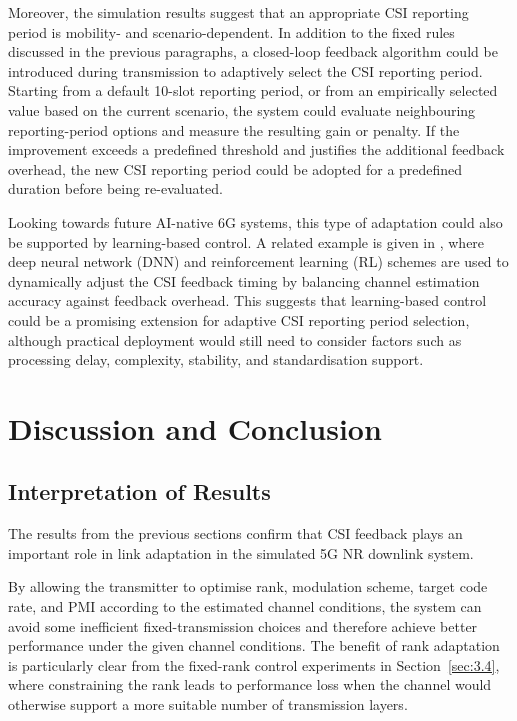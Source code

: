 \documentclass[a4paper,12pt,onecolumn]{article}
\begin{document}
		Moreover, the simulation results suggest that an appropriate CSI reporting period is mobility- and scenario-dependent. In addition to the fixed rules discussed in the previous paragraphs, a closed-loop feedback algorithm could be introduced during transmission to adaptively select the CSI reporting period. Starting from a default 10-slot reporting period, or from an empirically selected value based on the current scenario, the system could evaluate neighbouring reporting-period options and measure the resulting gain or penalty. If the improvement exceeds a predefined threshold and justifies the additional feedback overhead, the new CSI reporting period could be adopted for a predefined duration before being re-evaluated.

		Looking towards future AI-native 6G systems, this type of adaptation could also be supported by learning-based control. A related example is given in \cite{Hong2022AdaptiveCSI}, where deep neural network (DNN) and reinforcement learning (RL) schemes are used to dynamically adjust the CSI feedback timing by balancing channel estimation accuracy against feedback overhead. This suggests that learning-based control could be a promising extension for adaptive CSI reporting period selection, although practical deployment would still need to consider factors such as processing delay, complexity, stability, and standardisation support.
	
	

\section{Discussion and Conclusion}
	\subsection{Interpretation of Results}
		The results from the previous sections confirm that CSI feedback plays an important role in link adaptation in the simulated 5G NR downlink system. 
		
		By allowing the transmitter to optimise rank, modulation scheme, target code rate, and PMI according to the estimated channel conditions, the system can avoid some inefficient fixed-transmission choices and therefore achieve better performance under the given channel conditions. The benefit of rank adaptation is particularly clear from the fixed-rank control experiments in Section~\ref{sec:3.4}, where constraining the rank leads to performance loss when the channel would otherwise support a more suitable number of transmission layers.
\end{document}
